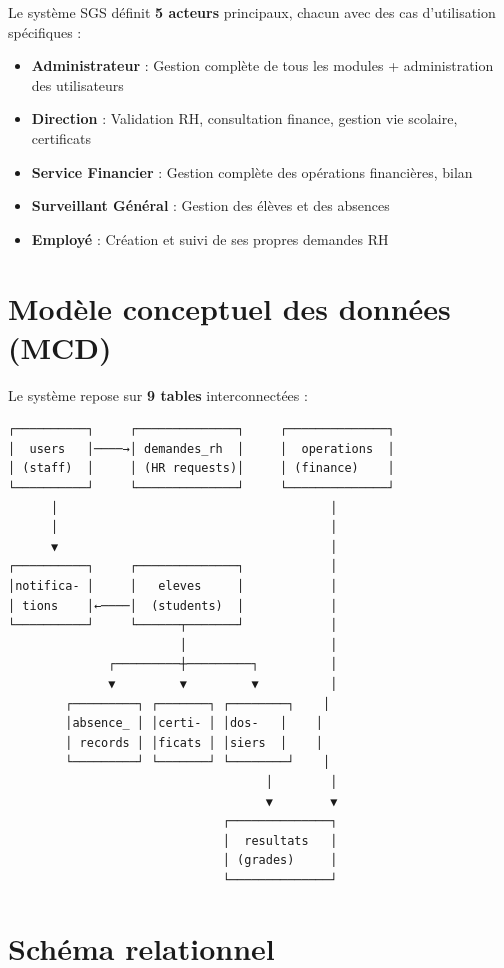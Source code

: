 \documentclass[12pt,a4paper]{report}
\begin{document}
Le système SGS définit \textbf{5 acteurs} principaux, chacun avec des cas d'utilisation spécifiques :

\begin{itemize}
    \item \textbf{Administrateur} : Gestion complète de tous les modules + administration des utilisateurs
    \item \textbf{Direction} : Validation RH, consultation finance, gestion vie scolaire, certificats
    \item \textbf{Service Financier} : Gestion complète des opérations financières, bilan
    \item \textbf{Surveillant Général} : Gestion des élèves et des absences
    \item \textbf{Employé} : Création et suivi de ses propres demandes RH
\end{itemize}

\section{Modèle conceptuel des données (MCD)}

Le système repose sur \textbf{9 tables} interconnectées :

\begin{verbatim}
┌──────────┐     ┌──────────────┐     ┌──────────────┐
│  users   │────→│ demandes_rh  │     │  operations  │
│ (staff)  │     │ (HR requests)│     │ (finance)    │
└──────────┘     └──────────────┘     └──────────────┘
      │                                      │
      │                                      │
      ▼                                      │
┌──────────┐     ┌──────────────┐            │
│notifica- │     │   eleves     │            │
│ tions    │←────│  (students)  │            │
└──────────┘     └──────┬───────┘            │
                        │                    │
              ┌─────────┼─────────┐          │
              ▼         ▼         ▼          │
        ┌─────────┐ ┌───────┐ ┌────────┐    │
        │absence_ │ │certi- │ │dos-   │    │
        │ records │ │ficats │ │siers  │    │
        └─────────┘ └───────┘ └────────┘    │
                                    │        │
                                    ▼        ▼
                              ┌──────────────┐
                              │  resultats   │
                              │ (grades)     │
                              └──────────────┘
\end{verbatim}

\section{Schéma relationnel}
\end{document}
